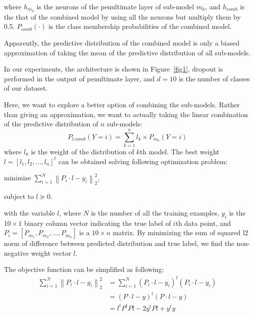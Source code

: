 \documentclass{article} %
\begin{document}
where $h_{m_{k}}$ is the neurons of the penultimate layer of sub-model $m_{k}$, and $h_{comb}$ is the that of the combined model by using all the neurons but multiply them by 0.5. $P_{comb}(\cdot)$ is the class membership probabilities of the combined model. 
\par
Apparently, the predictive distribution of the combined model is only a biased approximation of taking the mean of the predictive distribution of all sub-models.
\par
In our experiments, the architecture is shown in Figure~\ref{fig1}, dropout is performed in the output of penultimate layer, and $d=10$ is the number of classes of our dataset.
\par
Here, we want to explore a better option of combining the sub-models. Rather than giving an approximation, we want to actually taking the linear combination of the predictive distribution of $n$ sub-models:
\begin{equation}
P_{l.comb}(Y=i) = \sum_{k=1}^{n}l_{k}\times P_{m_{k}}(Y=i)
\end{equation}
where $l_{k}$ is the weight of the distribution of $k$th model. The best weight $l=\left[ l_{1},l_{2}, ..., l_{n}\right]^{t}$ can be obtained solving following optimization problem:
\par
\setlength{\parindent}{3em}
minimize $\sum_{i=1}^{N}\left \| P_{i}\cdot l-y_{i} \right \|_{2}^{2}$,
\par
\setlength{\parindent}{3em}
subject to $l\succeq 0$.
\setlength{\parindent}{0pt}
\par
with the variable $l$, where $N$ is the number of all the training examples, $y_{i}$ is the $10 \times 1$ binary column vector indicating the true label of $i$th data point, and $P_{i} =\left [ P_{m_{1}},P_{m_{2}},...,P_{m_{n}} \right ] $ is a $10 \times n$ matrix. By minimizing the sum of squared l2 norm of difference between predicted distribution and true label, we find the non-negative weight vector $l$.
\par
The objective function can be simplified as following:
\begin{equation}
\begin{split}
\sum_{i=1}^{N}\left \| P_{i}\cdot l-y_{i} \right \|_{2}^{2} &=\sum_{i=1}^{N}(P_{i}\cdot l-y_{i})^{t}(P_{i}\cdot l-y_{i})
 \\
&=(P\cdot l-y)^{t}(P\cdot l-y)
 \\
&=l^{t}P^{t}Pl-2y^{t}Pl+y^{t}y
\end{split}
\end{equation}
\end{document}
